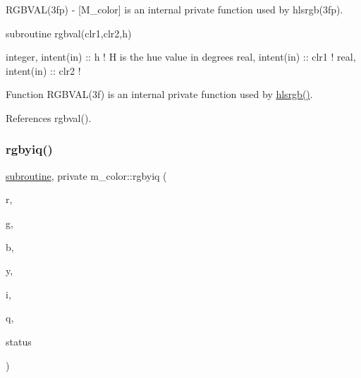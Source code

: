 \begin{DoxyDescription}
\item[\label{_RGBVAL}%
N\+A\+ME ]R\+G\+B\+V\+A\+L(3fp) -\/ \mbox{[}M\+\_\+color\mbox{]} is an internal private function used by hlsrgb(3fp). 


\item[S\+Y\+N\+O\+P\+S\+IS]
\begin{DoxyPre}
    subroutine rgbval(clr1,clr2,h)\end{DoxyPre}



\begin{DoxyPre}     integer, intent(in) :: h ! H is the hue value in degrees
     real, intent(in) :: clr1 !
     real, intent(in) :: clr2 !
    \end{DoxyPre}
 


\item[D\+E\+S\+C\+R\+I\+P\+T\+I\+ON ]Function R\+G\+B\+V\+A\+L(3f) is an internal private function used by \hyperlink{namespacem__color_a40e6c91da216384eded2157cdaf86eba}{hlsrgb()}.




\end{DoxyDescription}

References rgbval().

\mbox{\label{namespacem__color_a386d004a1392b7e01ff66f1676d43def}} 
\subsubsection{\texorpdfstring{rgbyiq()}{rgbyiq()}}
{\footnotesize\ttfamily \hyperlink{M__stopwatch_83_8txt_acfbcff50169d691ff02d4a123ed70482}{subroutine}, private m\+\_\+color\+::rgbyiq (\begin{DoxyParamCaption}\item[{\hyperlink{read__watch_83_8txt_abdb62bde002f38ef75f810d3a905a823}{real}, intent(\hyperlink{M__journal_83_8txt_afce72651d1eed785a2132bee863b2f38}{in})}]{r,  }\item[{\hyperlink{read__watch_83_8txt_abdb62bde002f38ef75f810d3a905a823}{real}, intent(\hyperlink{M__journal_83_8txt_afce72651d1eed785a2132bee863b2f38}{in})}]{g,  }\item[{\hyperlink{read__watch_83_8txt_abdb62bde002f38ef75f810d3a905a823}{real}, intent(\hyperlink{M__journal_83_8txt_afce72651d1eed785a2132bee863b2f38}{in})}]{b,  }\item[{\hyperlink{read__watch_83_8txt_abdb62bde002f38ef75f810d3a905a823}{real}, intent(out)}]{y,  }\item[{\hyperlink{read__watch_83_8txt_abdb62bde002f38ef75f810d3a905a823}{real}, intent(out)}]{i,  }\item[{\hyperlink{read__watch_83_8txt_abdb62bde002f38ef75f810d3a905a823}{real}, intent(out)}]{q,  }\item[{integer}]{status }\end{DoxyParamCaption})\hspace{0.3cm}{\ttfamily [private]}}


